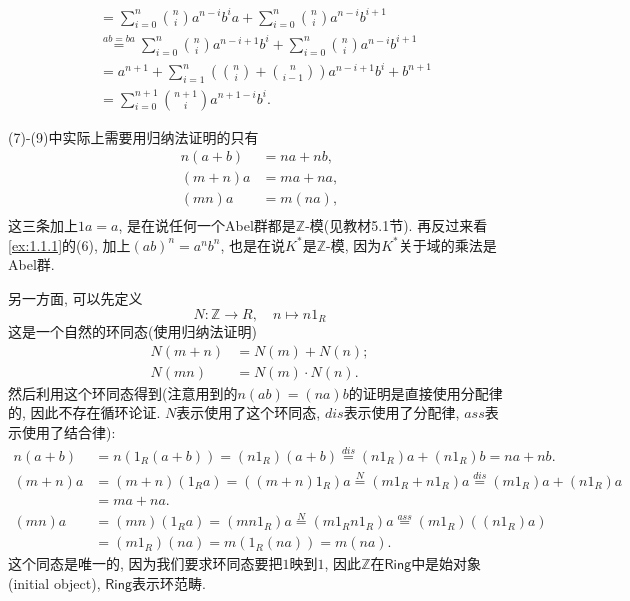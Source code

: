 \begin{solution}
\begin{enumerate}[(1)]
\[\begin{aligned}
        &= \sum_{i = 0}^{n} \binom{n}{i} a^{n - i}b^ia + \sum_{i = 0}^{n} \binom{n}{i} a^{n - i}b^{i + 1}\\
        &\overset{ab = ba}= \sum_{i = 0}^{n} \binom{n}{i} a^{n - i + 1}b^i + \sum_{i = 0}^{n} \binom{n}{i} a^{n - i}b^{i + 1}\\
        &= a^{n + 1} + \sum_{i = 1}^{n} \left(\binom{n}{i} + \binom{n}{i - 1}\right) a^{n - i + 1}b^{i} + b^{n + 1}\\
        &= \sum_{i = 0}^{n + 1} \binom{n + 1}{i} a^{n + 1 - i}b^i.
    \end{aligned}
    \]
    \end{enumerate}
(7)-(9)中实际上需要用归纳法证明的只有
\[
\begin{aligned}
    n(a + b) &= na + nb,\\
    (m + n)a &= ma + na,\\
    (mn)a &= m(na),\\
\end{aligned}
\]
这三条加上$1a = a$, 是在说任何一个Abel群都是$\mathbb{Z}$-模(见教材5.1节). 再反过来看\ref{ex:1.1.1}的(6), 加上$(ab)^n = a^nb^n$, 也是在说$K^*$是$\mathbb{Z}$-模, 因为$K^*$关于域的乘法是Abel群.

另一方面, 可以先定义
\[
    N: \mathbb{Z} \to R,\quad n \mapsto n1_R
\]
这是一个自然的环同态(使用归纳法证明)
\[
    \begin{aligned}
        N(m + n) &= N(m) + N(n);\\
        N(mn) &= N(m) \cdot N(n).
    \end{aligned}
\]
然后利用这个环同态得到(注意用到的$n(ab) = (na)b$的证明是直接使用分配律的, 因此不存在循环论证. $N$表示使用了这个环同态, $dis$表示使用了分配律, $ass$表示使用了结合律):
\[
    \begin{aligned}
        n(a + b) &= n(1_R(a + b)) = (n1_R)(a + b) \overset{dis}= (n1_R)a + (n1_R)b = na + nb.\\
        (m + n)a &= (m + n)(1_Ra) = ((m + n)1_R)a \overset{N}= (m1_R + n1_R)a \overset{dis}= (m1_R)a + (n1_R)a\\
        &= ma + na.\\
        (mn)a &= (mn)(1_Ra) = (mn1_R)a \overset{N}= (m1_Rn1_R)a \overset{ass}= (m1_R)((n1_R)a)\\
        &= (m1_R)(na) = m(1_R(na)) = m(na).
    \end{aligned}
\]
这个同态是唯一的, 因为我们要求环同态要把$1$映到$1$, 因此$\mathbb{Z}$在$\mathsf{Ring}$中是始对象(initial object), $\mathsf{Ring}$表示环范畴.
\end{solution}

